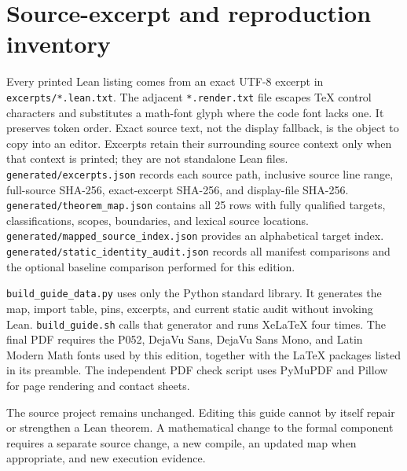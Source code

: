\documentclass[11pt,a4paper]{article}
\newcommand{\code}[1]{\nolinkurl{#1}}
\begin{document}
\section{Source-excerpt and reproduction inventory}\label{app:inventory}
Every printed Lean listing comes from an exact UTF-8 excerpt in \code{excerpts/*.lean.txt}. The adjacent \code{*.render.txt} file escapes TeX control characters and substitutes a math-font glyph where the code font lacks one. It preserves token order. Exact source text, not the display fallback, is the object to copy into an editor. Excerpts retain their surrounding source context only when that context is printed; they are not standalone Lean files.
\code{generated/excerpts.json} records each source path, inclusive source line range, full-source SHA-256, exact-excerpt SHA-256, and display-file SHA-256. \code{generated/theorem_map.json} contains all 25 rows with fully qualified targets, classifications, scopes, boundaries, and lexical source locations. \code{generated/mapped_source_index.json} provides an alphabetical target index. \code{generated/static_identity_audit.json} records all manifest comparisons and the optional baseline comparison performed for this edition.

\code{build_guide_data.py} uses only the Python standard library. It generates the map, import table, pins, excerpts, and current static audit without invoking Lean. \code{build_guide.sh} calls that generator and runs XeLaTeX four times. The final PDF requires the P052, DejaVu Sans, DejaVu Sans Mono, and Latin Modern Math fonts used by this edition, together with the LaTeX packages listed in its preamble. The independent PDF check script uses PyMuPDF and Pillow for page rendering and contact sheets.

The source project remains unchanged. Editing this guide cannot by itself repair or strengthen a Lean theorem. A mathematical change to the formal component requires a separate source change, a new compile, an updated map when appropriate, and new execution evidence.
\end{document}
